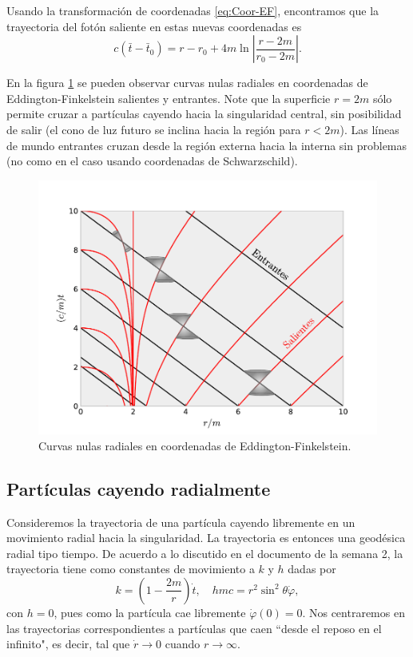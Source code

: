 \documentclass[letterpaper,11pt]{article}
\begin{document}
Usando la transformación de coordenadas \eqref{eq:Coor-EF}, encontramos que la trayectoria del fotón saliente en estas nuevas coordenadas es
\begin{equation}
c(\bar{t} - \bar{t}_0) = r - r_0 + 4m \ln \left| \frac{r-2m}{r_0 - 2m} \right|.
\end{equation}

En la figura \ref{fig:Null-Curves-EF} se pueden observar curvas nulas radiales en coordenadas de Eddington-Finkelstein salientes y entrantes. Note que la superficie $r = 2m$ sólo permite cruzar a partículas cayendo hacia la singularidad central, sin posibilidad de salir (el cono de luz futuro se inclina hacia la región para $r < 2m$). Las líneas de mundo entrantes cruzan desde la región externa hacia la interna sin problemas (no como en el caso usando coordenadas de Schwarzschild).

\begin{figure}
\centering
\includegraphics[scale=0.7]{Fig-Curvas-Nulas-Eddington-Finkelstein}
\caption{Curvas nulas radiales en coordenadas de Eddington-Finkelstein.}
\label{fig:Null-Curves-EF}
\end{figure}

\subsection*{Partículas cayendo radialmente}

Consideremos la trayectoria de una partícula cayendo libremente en un movimiento radial hacia la singularidad. La trayectoria es entonces una geodésica radial tipo tiempo. De acuerdo a lo discutido en el documento de la semana 2, la trayectoria tiene como constantes de movimiento a $k$ y $h$ dadas por
\begin{equation}
k = \left( 1  - \frac{2m}{r}\right) \dot{t}, \quad hmc = r^2\sin^2\theta \dot{\varphi}, \label{eq:particle-fall-1}
\end{equation}
con $h = 0$, pues como la partícula cae libremente $\dot{\varphi}(0) = 0$. Nos centraremos en las trayectorias correspondientes a partículas que caen ``desde el reposo en el infinito", es decir, tal que $\dot{r} \to 0$ cuando $r \to \infty$. 
\end{document}
